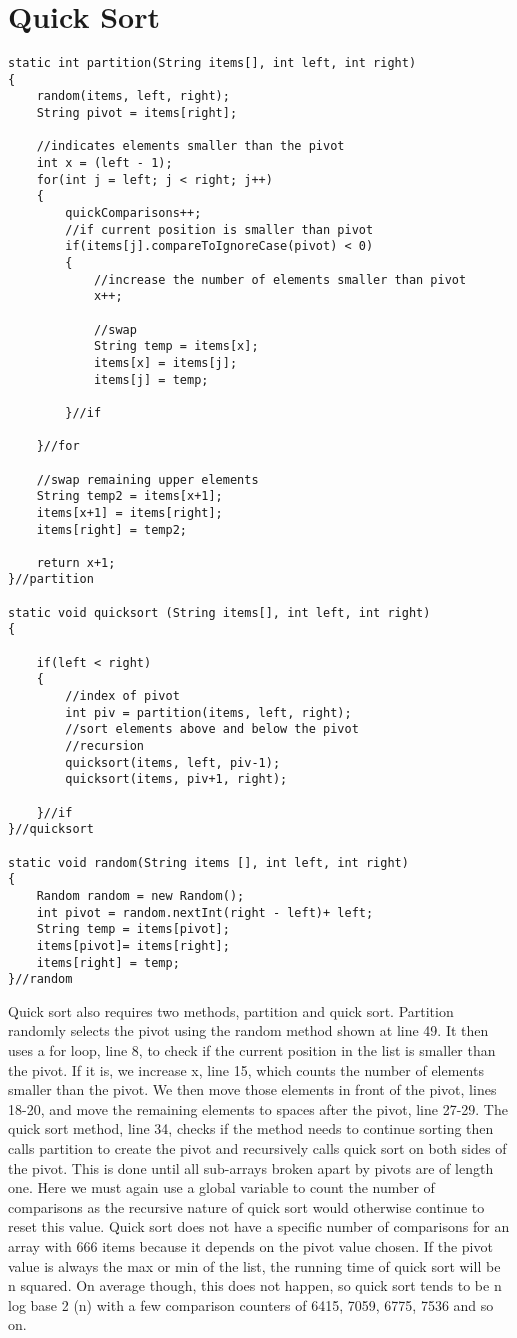\documentclass{article}
\begin{document}
\small
\section{Quick Sort}
\begin{lstlisting}[frame =single,
backgroundcolor = \color{grey!12}]
static int partition(String items[], int left, int right)
{
	random(items, left, right);
	String pivot = items[right];
	
	//indicates elements smaller than the pivot
	int x = (left - 1);
	for(int j = left; j < right; j++)
	{
		quickComparisons++;
		//if current position is smaller than pivot
		if(items[j].compareToIgnoreCase(pivot) < 0)
		{
			//increase the number of elements smaller than pivot
			x++;
			
			//swap
			String temp = items[x];
            items[x] = items[j];
            items[j] = temp;

		}//if
		
	}//for
	
	//swap remaining upper elements
	String temp2 = items[x+1];
    items[x+1] = items[right];
    items[right] = temp2;

    return x+1;
}//partition

static void quicksort (String items[], int left, int right)
{
	 
	if(left < right)
	{
		//index of pivot
		int piv = partition(items, left, right);
		//sort elements above and below the pivot
		//recursion
		quicksort(items, left, piv-1);
		quicksort(items, piv+1, right);
		
	}//if
}//quicksort

static void random(String items [], int left, int right)
{
	Random random = new Random();
	int pivot = random.nextInt(right - left)+ left;
	String temp = items[pivot];
	items[pivot]= items[right];
	items[right] = temp;
}//random
\end{lstlisting}
\large
Quick sort also requires two methods, partition and quick sort. Partition randomly selects the pivot using the random method shown at line 49. It then uses a for loop, line 8, to check if the current position in the list is smaller than the pivot. If it is, we increase x, line 15, which counts the number of elements smaller than the pivot. We then move those elements in front of the pivot, lines 18-20, and move the remaining elements to spaces after the pivot, line 27-29. The quick sort method, line 34, checks if the method needs to continue sorting then calls partition to create the pivot and recursively calls quick sort on both sides of the pivot. This is done until all sub-arrays broken apart by pivots are of length one. Here we must again use a global variable to count the number of comparisons as the recursive nature of quick sort would otherwise continue to reset this value. Quick sort does not have a specific number of comparisons for an array with 666 items because it depends on the pivot value chosen. If the pivot value is always the max or min of the list, the running time of quick sort will be n squared. On average though, this does not happen, so quick sort tends to be n log base 2 (n) with a few comparison counters of 6415, 7059, 6775, 7536 and so on. 
\end{document}
